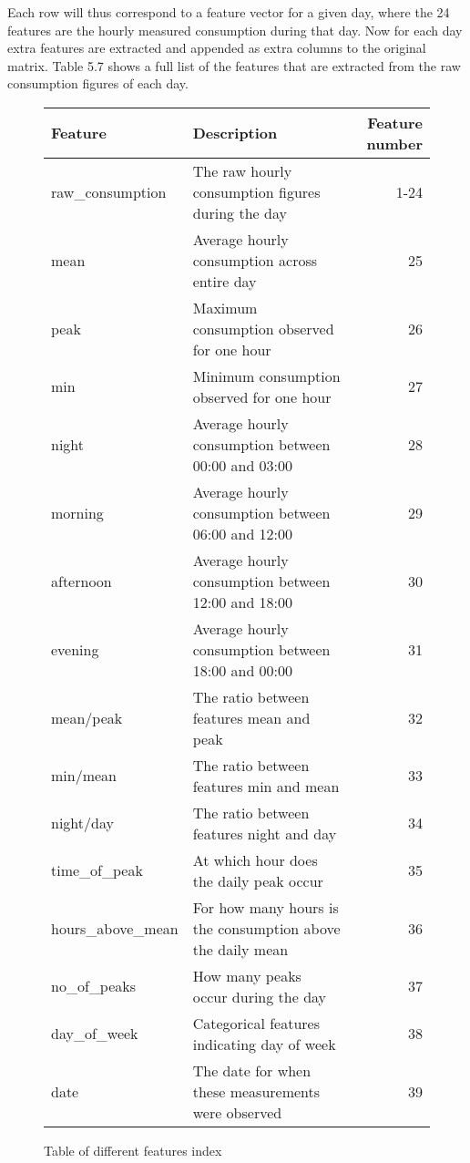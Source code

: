 Each row will thus correspond to a feature vector for a given day, where the 24 features are the hourly measured consumption during that day. Now for each day extra features are extracted and appended as extra columns to the original matrix. Table 5.7 shows a full list of the features that are extracted from the raw consumption figures of each day. 
\begin{figure}
\begin{center}
\begin{tabular}{|l | l | r |}
\hline
Feature & Description & Feature number \\ \hline
raw\_consumption & The raw hourly consumption figures during the day & 1-24 \\ \hline
mean & Average hourly consumption across entire day & 25 \\ \hline
peak & Maximum consumption observed for one hour&  26\\ \hline
min & Minimum consumption observed for one hour &  27\\ \hline
night & Average hourly consumption between 00:00 and 03:00 & 28 \\ \hline
morning & Average hourly consumption between 06:00 and 12:00 & 29 \\ \hline
afternoon & Average hourly consumption between 12:00 and 18:00 & 30 \\ \hline
evening & Average hourly consumption between 18:00 and 00:00 & 31 \\ \hline
mean/peak & The ratio between features mean and peak & 32\\ \hline
min/mean & The ratio between features min and mean&  33\\ \hline
night/day & The ratio between features night and day&  34\\ \hline
time\_of\_peak & At which hour does the daily peak occur& 35 \\ \hline
hours\_above\_mean & For how many hours is the consumption above the daily mean &  36\\ \hline
no\_of\_peaks & How many peaks occur during the day &  37\\ \hline
day\_of\_week & Categorical features indicating day of week& 38 \\ \hline
date & The date for when these measurements were observed &  39\\
\hline
\end{tabular}
\end{center}
\caption{Table of different features index}
\end{figure}
